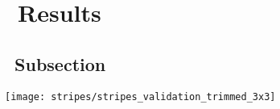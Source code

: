 \graphicspath{{images/}}

\section{\thesection~Results}
\label{sec:results}
\citep{palkova1997}

\subsection{\thesubsection~Subsection}

\begin{Figure}
  \centering
  \texttt{[image: stripes/stripes\_validation\_trimmed\_3x3]}
  \label{fig:stripes_validation}
\end{Figure}


